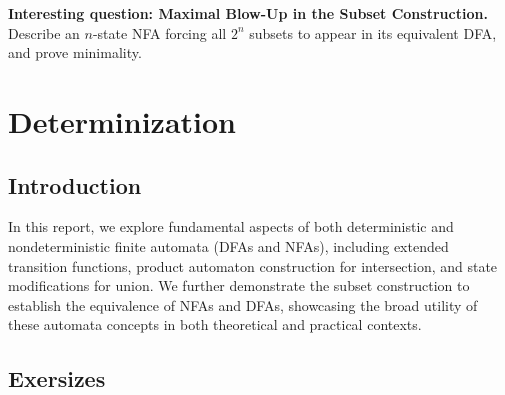 \documentclass{article}
\begin{document}
\textbf{Interesting question: Maximal Blow-Up in the Subset Construction.}\\
Describe an \(n\)-state NFA forcing all \(2^n\) subsets to appear in its equivalent DFA, and prove minimality.


\section{Determinization}

\subsection{Introduction}\label{sec:intro}
In this report, we explore fundamental aspects of both deterministic and nondeterministic finite automata (DFAs and NFAs), including extended transition functions, product automaton construction for intersection, and state modifications for union. We further demonstrate the subset construction to establish the equivalence of NFAs and DFAs, showcasing the broad utility of these automata concepts in both theoretical and practical contexts.
\newpage

\subsection{Exersizes}\label{sec:week-by-week}

\noindent
\end{document}
